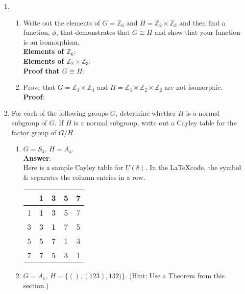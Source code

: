 \documentclass[12pt]{article}
\newcommand{\bbZ}{\mathbb{Z}}
\begin{document}
\begin{enumerate}
\item 
	\begin{enumerate}
	\item Write out the elements of $G=\bbZ_6$ and $H=\bbZ_2 \times \bbZ_3$ and then find a function, $\phi$, that demonstrates that $G \cong H$ and show that your function is an isomorphism.\\
	
	\textbf{Elements of $\bbZ_6$}: \\
	\textbf{Elements of $\bbZ_2 \times \bbZ_3$}: \\
	\textbf{Proof that $G \cong H$}: \\
	\vfill
	
	\item Prove that $G=\bbZ_3 \times \bbZ_4$ and $H=\bbZ_3 \times \bbZ_2 \times \bbZ_2$ are not isomorphic.\\
	\textbf{Proof}: \\
	\vfill
	\end{enumerate}
\newpage
\item For each of the following groups $G$, determine whether $H$ is a normal subgroup of $G$. If $H$ is a normal subgroup, write out a Cayley table for the factor group of $G/H.$
	\begin{enumerate}
	\item $G=S_4, \, H=A_4.$\\
	
	\textbf{Answer}: \\
	
	
Here is a sample Cayley table for $U(8)$. In the \LaTeX code, the symbol \& separates the column entries in a row. \\

\begin{tabular}{c | cccc}
 &1&3&5&7\\
 \hline
 1&1&3&5&7\\
 3&3&1&7&5\\
 5&5&7&1&3\\
 7&7&5&3&1\\
 \end{tabular}

	\vfill
	
	\item $G=A_5, \, H=\{(),(123),132)\}.$ (Hint: Use a Theorem from this section.) \\
	

\end{enumerate}
\end{enumerate}
\end{document}
